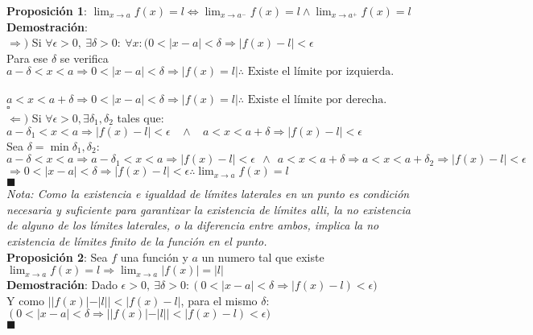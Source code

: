 \documentclass[11pt,a4paper]{article}
\newcommand*{\QEDA}{\null\nobreak\hfill\ensuremath{\blacksquare}}
\newcommand*{\QEDB}{\null\nobreak\hfill\ensuremath{\square}}
\begin{document}
\noindent \textbf{Proposici\'on 1}: $\displaystyle{ \lim_{x \to a} f(x) = l \iff \lim_{x \to a^-} f(x) = l \land \lim_{x \to a^+} f(x) = l}$\\
\noindent \textbf{Demostraci\'on}:\\ $\Rightarrow)$ Si $\forall \epsilon > 0,\ \exists \delta > 0:\ \forall x: (0<|x-a|<\delta \Rightarrow |f(x)-l|<\epsilon$\\
Para ese $\delta$ se verifica \ $a-\delta<x<a \Rightarrow 0<|x-a|<\delta \Rightarrow |f(x)=l| \therefore \text{ Existe el l\'imite por izquierda.}$\\
\indent \indent \indent \indent \indent \ \ \ \ \ \ $a<x<a+\delta \Rightarrow 0<|x-a|<\delta \Rightarrow |f(x)=l| \therefore \text{ Existe el l\'imite por derecha.}$ \\
\QEDB\\
$\Leftarrow)$ Si $\forall \epsilon > 0, \exists \delta_1, \delta_2$ tales que: \ \
$a-\delta_1 < x < a \Rightarrow |f(x)-l| < \epsilon \ \ \ \ \land \ \ \ \ a<x<a+\delta \Rightarrow |f(x)-l| < \epsilon$\\
Sea $\delta=\min{\delta_1, \delta_2}$:\\
$a-\delta<x<a \Rightarrow a-\delta_1<x<a \Rightarrow |f(x)-l| < \epsilon \ \ \land \ \ a<x<a+\delta \Rightarrow a<x<a+\delta_2 \Rightarrow |f(x)-l|<\epsilon$\\
$\Rightarrow 0<|x-a|<\delta \Rightarrow |f(x)-l| < \epsilon \therefore \displaystyle{\lim_{x \to a} f(x) = l}$\\
\QEDA \\
\textit{Nota: Como la existencia e igualdad de l\'imites laterales en un punto es condici\'on necesaria y suficiente para garantizar la existencia de l\'imites alli, la no existencia de alguno de los l\'imites laterales, o la diferencia entre ambos, implica la no existencia de l\'imites finito de la funci\'on en el punto.}\\

\noindent \textbf{Proposici\'on 2}: Sea $f$ una funci\'on y $a$ un numero tal que existe $\displaystyle{\lim_{x\to a}f(x) = l} \Rightarrow \lim_{x\to a}|f(x)|=|l|$\\
\textbf{Demostraci\'on}: Dado $\epsilon > 0,\ \exists \delta > 0 : (0<|x-a|<\delta \Rightarrow |f(x)-l)<\epsilon)$\\
Y como $||f(x)|-|l|| < |f(x)-l|$, para el mismo $\delta$: $(0<|x-a|<\delta \Rightarrow ||f(x)|-|l|| < |f(x)-l)<\epsilon)$\\ \QEDA \\
\end{document}
